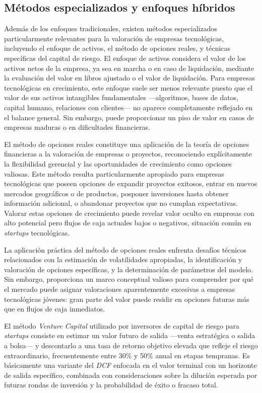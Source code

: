 \subsection{Métodos especializados y enfoques híbridos}

Además de los enfoques tradicionales, existen métodos especializados particularmente relevantes para la valoración de empresas tecnológicas, incluyendo el enfoque de activos, el método de opciones reales, y técnicas específicas del capital de riesgo. El enfoque de activos considera el valor de los activos netos de la empresa, ya sea en marcha o en caso de liquidación, mediante la evaluación del valor en libros ajustado o el valor de liquidación. Para empresas tecnológicas en crecimiento, este enfoque suele ser menos relevante puesto que el valor de sus activos intangibles fundamentales ---algoritmos, bases de datos, capital humano, relaciones con clientes--- no aparece completamente reflejado en el balance general. Sin embargo, puede proporcionar un piso de valor en casos de empresas maduras o en dificultades financieras.

El método de opciones reales constituye una aplicación de la teoría de opciones financieras a la valoración de empresas o proyectos, reconociendo explícitamente la flexibilidad gerencial y las oportunidades de crecimiento como opciones valiosas. Este método resulta particularmente apropiado para empresas tecnológicas que poseen opciones de expandir proyectos exitosos, entrar en nuevos mercados geográficos o de productos, posponer inversiones hasta obtener información adicional, o abandonar proyectos que no cumplan expectativas. Valorar estas opciones de crecimiento puede revelar valor oculto en empresas con alto potencial pero flujos de caja actuales bajos o negativos, situación común en \emph{startups} tecnológicas.

La aplicación práctica del método de opciones reales enfrenta desafíos técnicos relacionados con la estimación de volatilidades apropiadas, la identificación y valoración de opciones específicas, y la determinación de parámetros del modelo. Sin embargo, proporciona un marco conceptual valioso para comprender por qué el mercado puede asignar valoraciones aparentemente excesivas a empresas tecnológicas jóvenes: gran parte del valor puede residir en opciones futuras más que en flujos de caja inmediatos.

El método \emph{Venture Capital} utilizado por inversores de capital de riesgo para \emph{startups} consiste en estimar un valor futuro de salida ---venta estratégica o salida a bolsa--- y descontarlo a una tasa de retorno objetivo elevada que refleje el riesgo extraordinario, frecuentemente entre 30\% y 50\% anual en etapas tempranas. Es básicamente una variante del \emph{DCF} enfocada en el valor terminal con un horizonte de salida específico, combinada con consideraciones sobre la dilución esperada por futuras rondas de inversión y la probabilidad de éxito o fracaso total.

